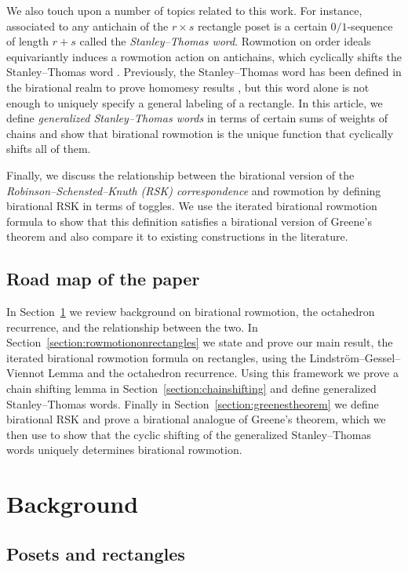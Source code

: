 We also touch upon a number of topics related to this work. For instance, associated to any antichain of the $r \times s$ rectangle poset is a certain $0/1$-sequence of length $r+s$ called the \emph{Stanley--Thomas word}. Rowmotion on order ideals equivariantly induces a rowmotion action on antichains, which cyclically shifts the Stanley--Thomas word \cite{propproby,stanley1}. Previously, the Stanley--Thomas word has been defined in the birational realm to prove homomesy results \cite{josephroby1}, but this word alone is not enough to uniquely specify a general labeling of a rectangle. In this article, we define \emph{generalized Stanley--Thomas words} in terms of certain sums of weights of chains and show that birational rowmotion is the unique function that cyclically shifts all of them. 

Finally, we discuss the relationship between the birational version of the \emph{Robinson--Schensted--Knuth (RSK) correspondence} \cite{danilovkoshevoy, noumiyamada} and rowmotion by defining birational RSK in terms of toggles. We use the iterated birational rowmotion formula to show that this definition satisfies a birational version of Greene's theorem and also compare it to existing constructions in the literature.

\subsection*{Road map of the paper} In Section~\ref{section:background} we review background on birational rowmotion, the octahedron recurrence, and the relationship between the two. In Section~\ref{section:rowmotiononrectangles} we state and prove our main result, the iterated birational rowmotion formula on rectangles, using the Lindstr\"om--Gessel--Viennot Lemma and the octahedron recurrence. Using this framework we prove a chain shifting lemma in Section~\ref{section:chainshifting} and define generalized Stanley--Thomas words. Finally in Section~\ref{section:greenestheorem} we define birational RSK and prove a birational analogue of Greene's theorem, which we then use to show that the cyclic shifting of the generalized Stanley--Thomas words uniquely determines birational rowmotion.

\section{Background} \label{section:background}

\subsection{Posets and rectangles}
\label{subsection:posets}


